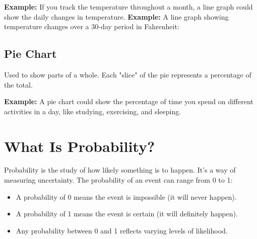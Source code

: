 \textbf{Example:} If you track the temperature throughout a month, a line graph could show the daily changes in temperature.
\textbf{Example:} A line graph showing temperature changes over a 30-day period in Fahrenheit:
\begin{center}
\end{center}

\subsection{Pie Chart}
Used to show parts of a whole. Each "slice" of the pie represents a percentage of the total.

\textbf{Example:} A pie chart could show the percentage of time you spend on different activities in a day, like studying, exercising, and sleeping.

\begin{center}
\end{center}
\section{What Is Probability?}
Probability is the study of how likely something is to happen. It’s a way of measuring uncertainty. The probability of an event can range from 0 to 1:

\begin{itemize}
    \item A probability of 0 means the event is impossible (it will never happen).
    \item A probability of 1 means the event is certain (it will definitely happen).
    \item Any probability between 0 and 1 reflects varying levels of likelihood.
\end{itemize}

